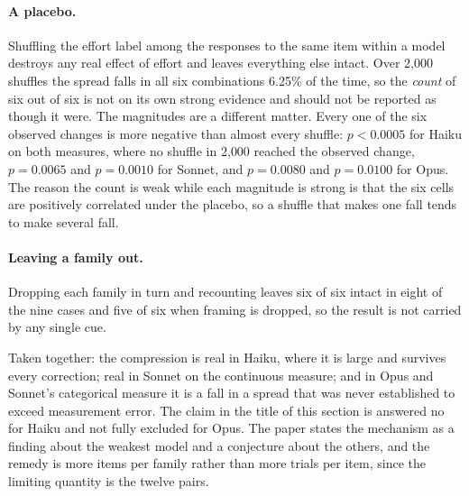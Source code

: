 \paragraph{A placebo.} Shuffling the effort label among the responses to the
same item within a model destroys any real effect of effort and leaves
everything else intact. Over 2{,}000 shuffles the spread falls in all six
combinations 6.25\% of the time, so the \textit{count} of six out of six is
not on its own strong evidence and should not be reported as though it were.
The magnitudes are a different matter. Every one of the six observed changes
is more negative than almost every shuffle: $p < 0.0005$ for Haiku on both
measures, where no shuffle in 2{,}000 reached the observed change, $p =
0.0065$ and $p = 0.0010$ for Sonnet, and $p = 0.0080$ and $p = 0.0100$ for
Opus. The reason the count is weak while each magnitude is strong is that the
six cells are positively correlated under the placebo, so a shuffle that
makes one fall tends to make several fall.

\paragraph{Leaving a family out.} Dropping each family in turn and recounting
leaves six of six intact in eight of the nine cases and five of six when
framing is dropped, so the result is not carried by any single cue.

Taken together: the compression is real in Haiku, where it is large and
survives every correction; real in Sonnet on the continuous measure; and in
Opus and Sonnet's categorical measure it is a fall in a spread that was never
established to exceed measurement error. The claim in the title of this
section is answered no for Haiku and not fully excluded for Opus. The paper
states the mechanism as a finding about the weakest model and a conjecture
about the others, and the remedy is more items per family rather than more
trials per item, since the limiting quantity is the twelve pairs.
